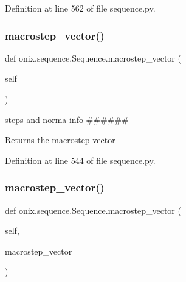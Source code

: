 Definition at line 562 of file sequence.\+py.

\mbox{\label{classonix_1_1sequence_1_1Sequence_a2ae5761c119ef41525c82c5db6b9af33}} 
\subsubsection{\texorpdfstring{macrostep\+\_\+vector()}{macrostep\_vector()}\hspace{0.1cm}{\footnotesize\ttfamily [1/2]}}
{\footnotesize\ttfamily def onix.\+sequence.\+Sequence.\+macrostep\+\_\+vector (\begin{DoxyParamCaption}\item[{}]{self }\end{DoxyParamCaption})}



steps and norma info \#\#\#\#\#\# 

\begin{DoxyVerb}Returns the macrostep vector\end{DoxyVerb}
 

Definition at line 544 of file sequence.\+py.

\mbox{\label{classonix_1_1sequence_1_1Sequence_ae0620ce8e449bf0a6a4181b179b6d0d9}} 
\subsubsection{\texorpdfstring{macrostep\+\_\+vector()}{macrostep\_vector()}\hspace{0.1cm}{\footnotesize\ttfamily [2/2]}}
{\footnotesize\ttfamily def onix.\+sequence.\+Sequence.\+macrostep\+\_\+vector (\begin{DoxyParamCaption}\item[{}]{self,  }\item[{}]{macrostep\+\_\+vector }\end{DoxyParamCaption})}

